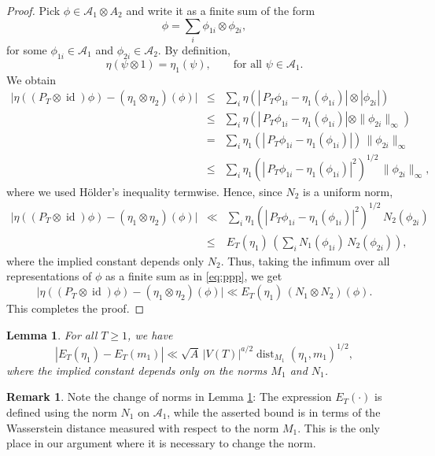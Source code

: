 \documentclass[11pt,reqno,a4paper]{amsart}
\numberwithin{equation}{section}
\newcommand{\cA}{\mathcal{A}}
\DeclareMathOperator{\dist}{dist}
\DeclareMathOperator{\id}{id}
\theoremstyle{theorem}
\newtheorem{lemma}[theorem]{Lemma}
\theoremstyle{definition}
\newtheorem{remark}[theorem]{Remark}
\begin{document}
\begin{proof}
Pick $\phi \in \cA_1 \otimes A_2$ and write it as a finite sum of the form
\begin{equation}\label{eq:ppp}
\phi = \sum_{i} \phi_{1i} \otimes \phi_{2i},
\end{equation}
for some $\phi_{1i} \in \cA_1$ and $\phi_{2i} \in \cA_2$. By definition, 
\[
\eta(\psi \otimes 1) = \eta_1(\psi), \quad\quad \textrm{for all $\psi \in \cA_1$}.
\]
We obtain
\begin{eqnarray*}
\big| \eta((P_T \otimes \id)\phi) - (\eta_1 \otimes \eta_2)(\phi) \big| 
&\leq& 
\sum_{i} \eta\left(| \, P_T \phi_{1i} - \eta_1(\phi_{1i}) | \otimes |\phi_{2i}|\right) \\
&\leq& 
\sum_{i} \eta\left(| \, P_T \phi_{1i} - \eta_1(\phi_{1i}) | \otimes \|\phi_{2i}\|_\infty\right) \\
&=&
\sum_{i} \eta_1\left(| \, P_T \phi_{1i} - \eta_1(\phi_{1i}) |\right) \, \| \phi_{2i} \|_\infty \\
&\le &
\sum_{i} \eta_1\left(| \, P_T \phi_{1i} - \eta_1(\phi_{1i}) |^2\right)^{1/2} \, \|\phi_{2i}\|_\infty,
\end{eqnarray*}
where we used H\"older's inequality termwise.
Hence, since $N_2$ is a uniform norm, 
\begin{eqnarray*}
\big| \eta((P_T \otimes \id)\phi) - (\eta_1 \otimes \eta_2)(\phi) \big| 
&\ll &
\sum_{i} \eta_1\left(| \, P_T \phi_{1i} - \eta_1(\phi_{1i}) |^2\right)^{1/2} \, N_2(\phi_{2i}) \\
&\leq &
E_T(\eta_1) \, \left( \sum_{i} N_1(\phi_{1i}) \, N_2(\phi_{2i})\right),
\end{eqnarray*}
where the implied constant depends only $N_2$.
Thus, taking the infimum over all representations of $\phi$ as a finite sum as in 
\eqref{eq:ppp}, we get
\[
\big| \eta((P_T \otimes \id)\phi) - (\eta_1 \otimes \eta_2)(\phi) \big| 
\ll E_T(\eta_1) \, (N_1 \otimes N_2)(\phi).
\]
This completes the proof.
\end{proof}

\begin{lemma}
\label{lemmaII.2}
For all $T \geq 1$, we have
\begin{equation}
\label{eqlemmaII.1}
|E_T(\eta_1) - E_T(m_1)| \ll \sqrt{A}\, |V(T)|^{a/2} \dist_{M_1}(\eta_1,m_1)^{1/2},
\end{equation}
where the implied constant depends only on the norms $M_1$ and $N_1$.
\end{lemma}

\begin{remark}
Note the change of norms in Lemma \ref{lemmaII.2}: The expression $E_T(\cdot)$ is defined 
using the norm $N_1$ on $\cA_1$, while the asserted bound  is in terms of 
the Wasserstein distance measured with respect to the norm $M_1$. This is the 
only place in our argument where it is necessary to change the norm.
\end{remark}
\end{document}
